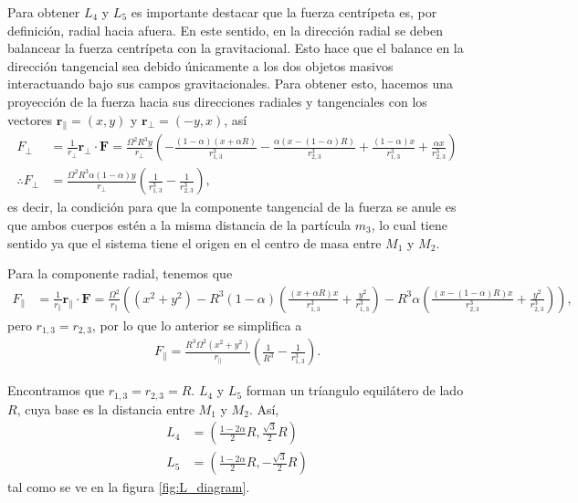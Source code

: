Para obtener $L_4$ y $L_5$ es importante destacar que la fuerza centrípeta es, por definición, radial hacia afuera. En este sentido, en la dirección radial se deben balancear la fuerza centrípeta con la gravitacional. Esto hace que el balance en la dirección tangencial sea debido únicamente a los dos objetos masivos interactuando bajo sus campos gravitacionales. Para obtener esto, hacemos una proyección de la fuerza hacia sus direcciones radiales y tangenciales con los vectores $\mathbf{r}_{\parallel} = (x,y)$ y $\mathbf{r}_{\bot} = (-y,x)$, así
\begin{align*}
 F_{\bot} &= \frac{1}{r_{\bot}} \mathbf{r}_{\bot} \cdot \mathbf{F} = \frac{\Omega^2R^3 y}{r_{\bot}} \left( - \frac{(1-\alpha)(x + \alpha R)}{ r_{1,3}^3 } - \frac{\alpha(x - (1-\alpha) R)}{ r_{2,3}^3 } + \frac{(1-\alpha)x}{ r_{1,3}^3 } + \frac{\alpha x}{ r_{2,3}^3 } \right) \\
 \therefore F_{\bot} &= \frac{\Omega^2R^3 \alpha (1-\alpha) y}{r_{\bot}} \left( \frac{1}{r_{1,3}^3} - \frac{1}{r_{2,3}^3} \right),
\end{align*}
es decir, la condición para que la componente tangencial de la fuerza se anule es que ambos cuerpos estén a la misma distancia de la partícula $m_3$, lo cual tiene sentido ya que el sistema tiene el origen en el centro de masa entre $M_1$ y $M_2$. 

Para la componente radial, tenemos que
\begin{align*}
 F_{\parallel} &= \frac{1}{r_{\parallel}} \mathbf{r}_{\parallel} \cdot \mathbf{F} = \frac{\Omega^2}{r_\parallel} \left( (x^2 + y^2) - R^3 (1-\alpha ) \left( \frac{(x+ \alpha R)x}{r_{1,3}^3} + \frac{y^2}{r_{1,3}^3} \right) - R^3 \alpha \left( \frac{(x - (1-\alpha) R)x}{r_{2,3}^3} + \frac{y^2}{r_{2,3}^3} \right) \right),
\end{align*}
pero $r_{1,3} = r_{2,3}$, por lo que lo anterior se simplifica a 
\begin{align*}
 F_{\parallel} = \frac{R^3 \Omega^2 (x^2 + y^2)}{r_\parallel} \left( \frac{1}{R^3} - \frac{1}{r_{1,3}^3} \right).
\end{align*}

Encontramos que $r_{1,3} = r_{2,3} = R$. $L_4$ y $L_5$ forman un tríangulo equilátero de lado $R$, cuya base es la distancia entre $M_1$ y $M_2$. Así,
\begin{align}
 L_4 &= \left( \frac{1 - 2\alpha}{2}  R , \frac{\sqrt{3}}{2} R \right) \\
 L_5 &= \left( \frac{1 - 2\alpha}{2}  R  , -\frac{\sqrt{3}}{2} R \right)
 \label{eq:L4_L5}
\end{align} 
tal como se ve en la figura \ref{fig:L_diagram}.

